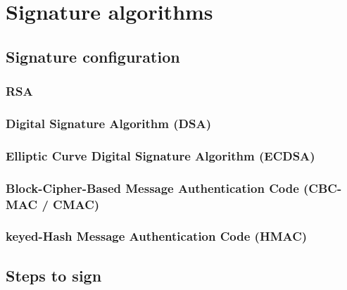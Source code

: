 \chapter{Signature algorithms}

\section{Signature configuration}
\subsection{RSA}
\subsection{Digital Signature Algorithm (DSA)}
\subsection{Elliptic Curve Digital Signature Algorithm (ECDSA)}
\subsection{Block-Cipher-Based Message Authentication Code (CBC-MAC / CMAC)}
\subsection{keyed-Hash Message Authentication Code (HMAC)}


\section{Steps to sign}